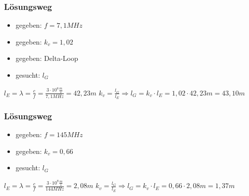 \begin{frame}
\frametitle{Lösungsweg}
\begin{itemize}
  \item gegeben: $f = 7,1MHz$
  \item gegeben: $k_v = 1,02$
  \item gegeben: Delta-Loop
  \item gesucht: $l_G$
  \end{itemize}
    \pause
    $l_E = \lambda = \frac{c}{f} = \frac{3\cdot 10^8\frac{m}{s}}{7,1MHz} = 42,23m$
    \pause
    $k_v = \frac{l_G}{l_E} \Rightarrow l_G = k_v \cdot l_E = 1,02 \cdot 42,23m = 43,10m$



\end{frame}

\begin{frame}
\end{frame}

\begin{frame}
\frametitle{Lösungsweg}
\begin{itemize}
  \item gegeben: $f = 145MHz$
  \item gegeben: $k_v = 0,66$
  \item gesucht: $l_G$
  \end{itemize}
    \pause
    $l_E = \lambda = \frac{c}{f} = \frac{3\cdot 10^8\frac{m}{s}}{144MHz} = 2,08m$
    \pause
    $k_v = \frac{l_G}{l_E} \Rightarrow l_G = k_v \cdot l_E = 0,66 \cdot 2,08m = 1,37m$



\end{frame}%
